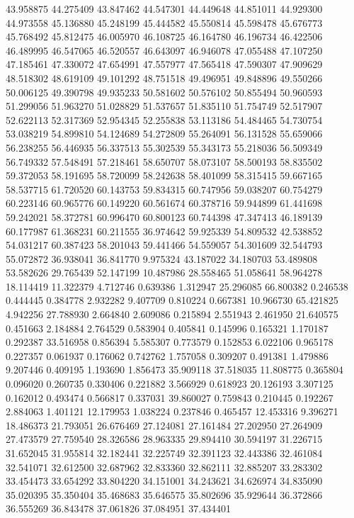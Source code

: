43.958875
44.275409
43.847462
44.547301
44.449648
44.851011
44.929300
44.973558
45.136880
45.248199
45.444582
45.550814
45.598478
45.676773
45.768492
45.812475
46.005970
46.108725
46.164780
46.196734
46.422506
46.489995
46.547065
46.520557
46.643097
46.946078
47.055488
47.107250
47.185461
47.330072
47.654991
47.557977
47.565418
47.590307
47.909629
48.518302
48.619109
49.101292
48.751518
49.496951
49.848896
49.550266
50.006125
49.390798
49.935233
50.581602
50.576102
50.855494
50.960593
51.299056
51.963270
51.028829
51.537657
51.835110
51.754749
52.517907
52.622113
52.317369
52.954345
52.255838
53.113186
54.484465
54.730754
53.038219
54.899810
54.124689
54.272809
55.264091
56.131528
55.659066
56.238255
56.446935
56.337513
55.302539
55.343173
55.218036
56.509349
56.749332
57.548491
57.218461
58.650707
58.073107
58.500193
58.835502
59.372053
58.191695
58.720099
58.242638
58.401099
58.315415
59.667165
58.537715
61.720520
60.143753
59.834315
60.747956
59.038207
60.754279
60.223146
60.965776
60.149220
60.561674
60.378716
59.944899
61.441698
59.242021
58.372781
60.996470
60.800123
60.744398
47.347413
46.189139
60.177987
61.368231
60.211555
36.974642
59.925339
54.809532
42.538852
54.031217
60.387423
58.201043
59.441466
54.559057
54.301609
32.544793
55.072872
36.938041
36.841770
9.975324
43.187022
34.180703
53.489808
53.582626
29.765439
52.147199
10.487986
28.558465
51.058641
58.964278
18.114419
11.322379
4.712746
0.639386
1.312947
25.296085
66.800382
0.246538
0.444445
0.384778
2.932282
9.407709
0.810224
0.667381
10.966730
65.421825
4.942256
27.788930
2.664840
2.609086
0.215894
2.551943
2.461950
21.640575
0.451663
2.184884
2.764529
0.583904
0.405841
0.145996
0.165321
1.170187
0.292387
33.516958
0.856394
5.585307
0.773579
0.152853
6.022106
0.965178
0.227357
0.061937
0.176062
0.742762
1.757058
0.309207
0.491381
1.479886
9.207446
0.409195
1.193690
1.856473
35.909118
37.518035
11.808775
0.365804
0.096020
0.260735
0.330406
0.221882
3.566929
0.618923
20.126193
3.307125
0.162012
0.493474
0.566817
0.337031
39.860027
0.759843
0.210445
0.192267
2.884063
1.401121
12.179953
1.038224
0.237846
0.465457
12.453316
9.396271
18.486373
21.793051
26.676469
27.124081
27.161484
27.202950
27.264909
27.473579
27.759540
28.326586
28.963335
29.894410
30.594197
31.226715
31.652045
31.955814
32.182441
32.225749
32.391123
32.443386
32.461084
32.541071
32.612500
32.687962
32.833360
32.862111
32.885207
33.283302
33.454473
33.654292
33.804220
34.151001
34.243621
34.626974
34.835090
35.020395
35.350404
35.468683
35.646575
35.802696
35.929644
36.372866
36.555269
36.843478
37.061826
37.084951
37.434401
